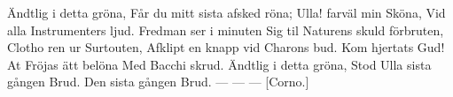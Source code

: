 \beginverse*						%
Ändtlig i detta gröna,
Får du mitt sista afsked röna;
Ulla! farväl min Sköna,
Vid alla Instrumenters ljud.
Fredman ser i minuten
Sig til Naturens skuld förbruten,
Clotho ren ur Surtouten,
Afklipt en knapp vid Charons bud.
Kom hjertats Gud!
At Fröjas ätt belöna
Med Bacchi skrud.
Ändtlig i detta gröna,
Stod Ulla sista gången Brud.
Den sista gången Brud. — — — [Corno.]
\endverse							%



\endsong							%